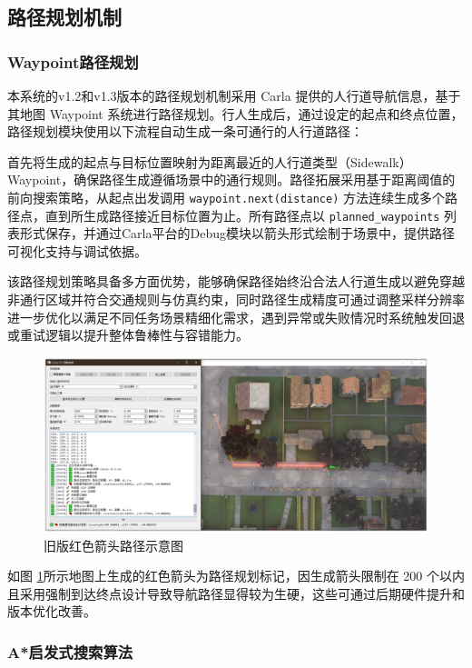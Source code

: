 \subsection{路径规划机制}

\subsubsection{Waypoint路径规划}
	
本系统的v1.2和v1.3版本的路径规划机制采用 Carla 提供的人行道导航信息，基于其地图 Waypoint 系统进行路径规划。行人生成后，通过设定的起点和终点位置，路径规划模块使用以下流程自动生成一条可通行的人行道路径：

首先将生成的起点与目标位置映射为距离最近的人行道类型（Sidewalk）Waypoint，确保路径生成遵循场景中的通行规则。路径拓展采用基于距离阈值的前向搜索策略，从起点出发调用 \texttt{waypoint.next(distance)} 方法连续生成多个路径点，直到所生成路径接近目标位置为止。所有路径点以 \texttt{planned\_waypoints} 列表形式保存，并通过Carla平台的Debug模块以箭头形式绘制于场景中，提供路径可视化支持与调试依据。

该路径规划策略具备多方面优势，能够确保路径始终沿合法人行道生成以避免穿越非通行区域并符合交通规则与仿真约束，同时路径生成精度可通过调整采样分辨率进一步优化以满足不同任务场景精细化需求，遇到异常或失败情况时系统触发回退或重试逻辑以提升整体鲁棒性与容错能力。

\begin{figure}[H]
	\centering
	\includegraphics[width=1\textwidth]{images/path_waypoint1.pdf}
	\caption{旧版红色箭头路径示意图}
	\label{fig:way1}
\end{figure}

如图 \ref{fig:way1}所示地图上生成的红色箭头为路径规划标记，因生成箭头限制在 200 个以内且采用强制到达终点设计导致导航路径显得较为生硬，这些可通过后期硬件提升和版本优化改善。

\subsubsection{A*启发式搜索算法}

